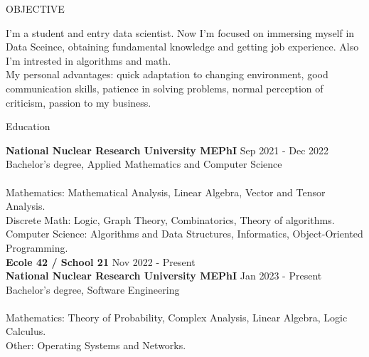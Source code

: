 \documentclass{resume} %
\begin{document}

\begin{rSection}{OBJECTIVE}

I'm a student and entry data scientist. Now I'm focused on immersing myself in Data Sceince, obtaining fundamental knowledge and getting job experience. Also I'm intrested in algorithms and math. \\
My personal advantages: quick adaptation to changing environment, good communication skills, patience in solving problems, normal perception of criticism, passion to my business.


\end{rSection}

\begin{rSection}{Education}

{\textbf{National Nuclear Research University MEPhI}} \hfill { Sep 2021 - Dec 2022}
\\ 
Bachelor's degree, Applied Mathematics and Computer Science\\ \\ 
Mathematics: Mathematical Analysis, Linear Algebra, Vector and Tensor Analysis. \\ 
Discrete Math: Logic, Graph Theory, Combinatorics, Theory of algorithms. \\
Computer Science: Algorithms and Data Structures, Informatics, Object-Oriented Programming. \\

{\bf Ecole 42 / School 21} \hfill { Nov 2022 - Present} \\ 

{\bf National Nuclear Research University MEPhI} \hfill { Jan 2023 - Present}
\\ 
Bachelor's degree, Software Engineering\\ \\ 
Mathematics: Theory of Probability, Complex Analysis, Linear Algebra, Logic Calculus. \\
Other: Operating Systems and Networks. \\







\end{rSection}
\end{document}
